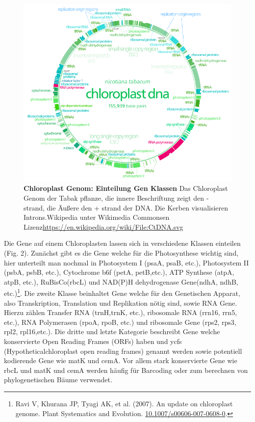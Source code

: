 \documentclass{scrartcl}
\begin{document}
\begin{figure}
\includegraphics[width=.9\linewidth]{./703px-CtDNA.png}
\caption[Chloroplast Genom: Gen Klassen]{\textbf{Chloroplast Genom: Einteilung Gen Klassen} Das Chloroplast Genom der Tabak pflanze, die innere Beschriftung zeigt den - strand, die Äußere den + strand der DNA. Die Kerben visualisieren Introns.Wikipedia unter Wikimedia Commonsen Lizenz\url{https://en.wikipedia.org/wiki/File:CtDNA.svg}}
\end{figure}
Die Gene auf einem Chloroplasten lassen sich in verschiedene Klassen einteilen (Fig. 2). Zunächst gibt es die Gene welche für die Photosynthese wichtig sind,
hier unterteilt man nochmal in Photosystem I (psaA, psaB, etc.), Photosystem II (psbA, psbB, etc.), Cytochrome b6f (petA, petB,etc.), 
ATP Synthese (atpA, atpB, etc.), RuBisCo(rbcL) und NAD(P)H dehydrogenase Gene(ndhA, ndhB, etc.)\footnote{Ravi V, Khurana JP, Tyagi AK, et al. (2007). An update on chloroplast genome. Plant Systematics and Evolution. \url{10.1007/s00606-007-0608-0}.}. Die zweite Klasse beinhaltet Gene welche für den
Genetischen Apparat, also Transkription, Translation und Replikation nötig sind, sowie RNA Gene. Hierzu zählen Transfer RNA (trnH,trnK, etc.), ribosomale RNA (rrn16, rrn5, etc.), 
RNA Polymerasen (rpoA, rpoB, etc.) und ribosomale Gene (rps2, rps3, rpl2, rpl16,etc.). Die dritte und letzte Kategorie beschreibt Gene welche konservierte Open Reading Frames (ORFs) haben und
ycfs (Hypotheticalchloroplast open reading frames) genannt werden sowie potentiell kodierende Gene wie matK und cemA\footnotemark[12]{}. Vor allem stark konservierte Gene wie rbcL und matK und cemA werden 
häufig für Barcoding oder zum berechnen von phylogenetischen Bäume verwendet.
\end{document}
